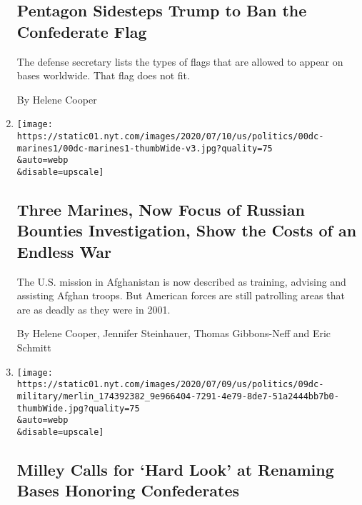 \begin{enumerate}
  \hypertarget{pentagon-sidesteps-trump-to-ban-the-confederate-flag}{%
  \subsection{Pentagon Sidesteps Trump to Ban the Confederate
  Flag}\label{pentagon-sidesteps-trump-to-ban-the-confederate-flag}}

  The defense secretary lists the types of flags that are allowed to
  appear on bases worldwide. That flag does not fit.

  By Helene Cooper
\item
  \href{/2020/07/14/us/politics/afghanistan-russia-bounties-marines.html}{}

  \texttt{[image: https://static01.nyt.com/images/2020/07/10/us/politics/00dc-marines1/00dc-marines1-thumbWide-v3.jpg?quality=75\\\&auto=webp\\\&disable=upscale]}

  \hypertarget{three-marines-now-focus-of-russian-bounties-investigation-show-the-costs-of-an-endless-war}{%
  \subsection{Three Marines, Now Focus of Russian Bounties
  Investigation, Show the Costs of an Endless
  War}\label{three-marines-now-focus-of-russian-bounties-investigation-show-the-costs-of-an-endless-war}}

  The U.S. mission in Afghanistan is now described as training, advising
  and assisting Afghan troops. But American forces are still patrolling
  areas that are as deadly as they were in 2001.

  By Helene Cooper, Jennifer Steinhauer, Thomas Gibbons-Neff and Eric
  Schmitt
\item
  \href{/2020/07/09/us/politics/milley-trump-confederate-base-names.html}{}

  \texttt{[image: https://static01.nyt.com/images/2020/07/09/us/politics/09dc-military/merlin\_174392382\_9e966404-7291-4e79-8de7-51a2444bb7b0-thumbWide.jpg?quality=75\\\&auto=webp\\\&disable=upscale]}

  \hypertarget{milley-calls-for-hard-look-at-renaming-bases-honoring-confederates}{%
  \subsection{Milley Calls for `Hard Look' at Renaming Bases Honoring
  Confederates}\label{milley-calls-for-hard-look-at-renaming-bases-honoring-confederates}}


\end{enumerate}
